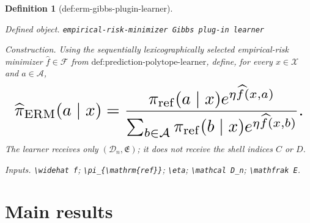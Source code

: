 \documentclass{article}
\newtheorem{definition}{Definition}
\begin{document}
\begin{definition}[def:erm-gibbs-plugin-learner]\label{def:erm-gibbs-plugin-learner}
\par\smallskip\noindent\emph{Defined object.} \texttt{empirical-\allowbreak{}risk-\allowbreak{}minimizer Gibbs plug-\allowbreak{}in learner}
\par\smallskip\noindent\emph{Construction.} Using the sequentially lexicographically selected empirical-risk minimizer \(\widehat f\in\mathcal F\) from \(\text{def:prediction-polytope-learner}\), define, for every \(x\in\mathcal X\) and \(a\in\mathcal A\),
\[
\makebox[\linewidth][c]{\resizebox{0.98\linewidth}{!}{\(\displaystyle \widehat\pi_{\mathrm{ERM}}(a\mid x)
=\frac{\pi_{\mathrm{ref}}(a\mid x)e^{\eta\widehat f(x,a)}}{\sum_{b\in\mathcal A}\pi_{\mathrm{ref}}(b\mid x)e^{\eta\widehat f(x,b)}}.\)}}
\]
The learner receives only \((\mathcal D_n,\mathfrak E)\); it does not receive the shell indices \(C\) or \(D\).
\par\smallskip\noindent\emph{Inputs.} \texttt{\textbackslash{}\allowbreak{}widehat f}; \texttt{\textbackslash{}\allowbreak{}pi\_\allowbreak{}\{\textbackslash{}\allowbreak{}mathrm\{ref\}\allowbreak{}\}\allowbreak{}}; \texttt{\textbackslash{}\allowbreak{}eta}; \texttt{\textbackslash{}\allowbreak{}mathcal D\_\allowbreak{}n}; \texttt{\textbackslash{}\allowbreak{}mathfrak E}.
\end{definition}

\section{Main results}
\end{document}
